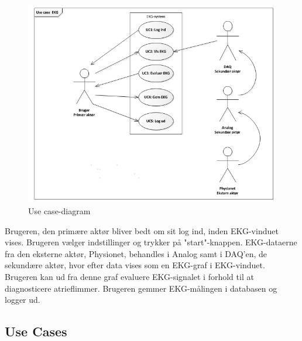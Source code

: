 \begin{figure}[htb]
	\centering
	\includegraphics[width=1\textwidth]{Figurer/Snip20150327_24}
	\caption{Use case-diagram}
	\label{fig:Use Cases}
\end{figure}

Brugeren, den primære aktør bliver bedt om sit log ind, inden EKG-vinduet vises. Brugeren vælger indstillinger og trykker på "start"-knappen. EKG-dataerne fra den eksterne aktør, Physionet, behandles i Analog samt i DAQ'en, de sekundære aktør, hvor efter data vises som en EKG-graf i EKG-vinduet. Brugeren kan ud fra denne graf evaluere EKG-signalet i forhold til at diagnosticere atrieflimmer. Brugeren gemmer EKG-målingen i databasen og logger ud. 

\subsection{Use Cases}

